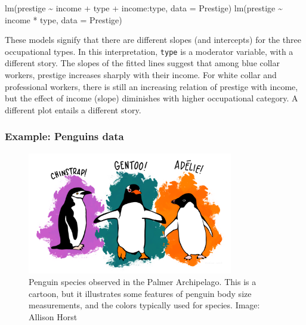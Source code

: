 \documentclass[
  letterpaper,
  10pt,
  krantz2]{krantz}
\makeatletter
\newenvironment{Shaded}{\begin{snugshade}}{\end{snugshade}}
\newcommand{\AttributeTok}[1]{\textcolor[rgb]{0.40,0.45,0.13}{#1}}
\newcommand{\FunctionTok}[1]{\textcolor[rgb]{0.28,0.35,0.67}{#1}}
\newcommand{\NormalTok}[1]{\textcolor[rgb]{0.00,0.23,0.31}{#1}}
\newcommand{\SpecialCharTok}[1]{\textcolor[rgb]{0.37,0.37,0.37}{#1}}
\newenvironment{kframe}{%
  \medskip{}
  \setlength{\fboxsep}{.8em}
  \def\at@end@of@kframe{}%
  \ifinner\ifhmode%
  \def\at@end@of@kframe{\end{minipage}}%
  \begin{minipage}{\columnwidth}%
  \fi\fi%
  \def\FrameCommand##1{\hskip\@totalleftmargin \hskip-\fboxsep
  \colorbox{shadecolor}{##1}\hskip-\fboxsep
      \hskip-\linewidth \hskip-\@totalleftmargin \hskip\columnwidth}%
  \MakeFramed {\advance\hsize-\width
    \@totalleftmargin\z@ \linewidth\hsize
    \@setminipage}}%
{\par\unskip\endMakeFramed%
  \at@end@of@kframe}
\renewenvironment{Shaded}{\begin{kframe}}{\end{kframe}}
\makeatother
\begin{document}
\begin{Shaded}
\begin{Highlighting}[]
\FunctionTok{lm}\NormalTok{(prestige }\SpecialCharTok{\textasciitilde{}}\NormalTok{ income }\SpecialCharTok{+}\NormalTok{ type }\SpecialCharTok{+}\NormalTok{ income}\SpecialCharTok{:}\NormalTok{type, }\AttributeTok{data =}\NormalTok{ Prestige)}
\FunctionTok{lm}\NormalTok{(prestige }\SpecialCharTok{\textasciitilde{}}\NormalTok{ income }\SpecialCharTok{*}\NormalTok{ type, }\AttributeTok{data =}\NormalTok{ Prestige)}
\end{Highlighting}
\end{Shaded}

These models signify that there are different slopes (and intercepts)
for the three occupational types. In this interpretation, \texttt{type}
is a moderator variable, with a different story. The slopes of the
fitted lines suggest that among blue collar workers, prestige increases
sharply with their income. For white collar and professional workers,
there is still an increasing relation of prestige with income, but the
effect of income (slope) diminishes with higher occupational category. A
different plot entails a different story.

\hypertarget{sec-penguins}{%
\subsubsection{Example: Penguins data}\label{sec-penguins}}

\begin{figure}

{\centering \includegraphics[width=0.8\textwidth,height=\textheight]{images/penguins-horst.png}

}

\caption{\label{fig-penguin-species}Penguin species observed in the
Palmer Archipelago. This is a cartoon, but it illustrates some features
of penguin body size measurements, and the colors typically used for
species. Image: Allison Horst}

\end{figure}
\end{document}
